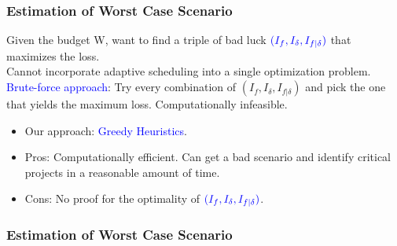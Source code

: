 \documentclass{beamer}
\newcommand{\tblue}{\textcolor{blue}}
\begin{document}
\begin{frame}
\frametitle{Estimation of Worst Case Scenario}
 Given the budget W, want to find a triple of bad luck $\tblue{(I_f, I_{\delta}, I_{f|\delta})}$ that maximizes the loss.\\
\bigskip
Cannot incorporate adaptive scheduling into a single optimization problem.\\
\bigskip
\tblue{Brute-force approach}: Try every combination of $(I_f, I_{\delta}, I_{f|\delta})$ and pick the one that yields the maximum loss. Computationally infeasible.
\end{frame}

\begin{frame}
\begin{itemize}
\frametitle{Estimation of Worst Case Scenario}
\item Our approach: \tblue{Greedy Heuristics}.
\bigskip
\item Pros: Computationally efficient. Can get a bad scenario and identify critical projects in a reasonable amount of time.
\bigskip
\item Cons: No proof for the optimality of $\tblue{(I_f, I_{\delta}, I_{f|\delta})}$.
\end{itemize}
\end{frame}

    \begin{frame}
\frametitle{Estimation of Worst Case Scenario}

\begin{algorithm}[H]
\While{The bad luck budget is not used up}{
Add the project with type of bad luck that yields the maximum loss into the triple $(I_f, I_{\delta}, I_{f|\delta})$.
% 
% 
} 

\end{algorithm} 
\end{frame}

%
%                       
%                       
%
\end{document}
